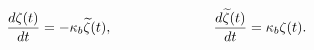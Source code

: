 \begin{equation}
\label{fermiondynamics2}
\frac{d\zeta(t)}{dt} = -\kappa_b{\widetilde \zeta}(t),
\hspace{1.0in}
\frac{d{\widetilde \zeta}(t)}{dt} = \kappa_b\zeta(t).
\end{equation}

